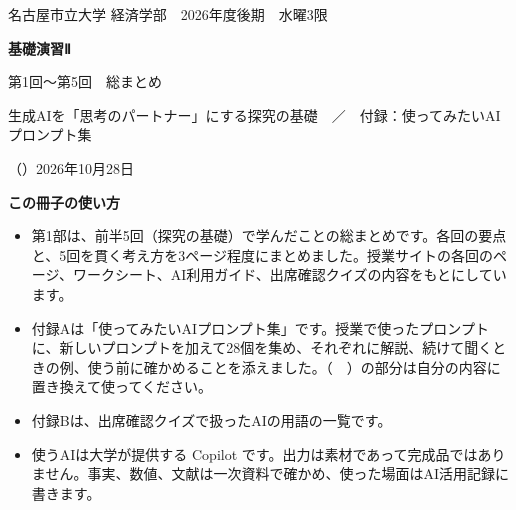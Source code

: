 
\renewcommand*\doctitle{第1回〜第5回 総まとめ}
\renewcommand*\docdate{2026年10月28日}



\thispagestyle{cover}
\vspace*{8mm}
{\sffamily\color{pone}\large 名古屋市立大学 経済学部　2026年度後期　水曜3限}\par
\vspace{3mm}
{\sffamily\bfseries\fontsize{30pt}{38pt}\selectfont 基礎演習Ⅱ}\par
\vspace{2mm}
{\sffamily\fontsize{20pt}{26pt}\selectfont 第1回〜第5回　総まとめ}\par
\vspace{2.5mm}
{\sffamily\color{inktwo}生成AIを「思考のパートナー」にする探究の基礎　／　付録：使ってみたいAIプロンプト集}\par
\vspace{4mm}
\noindent{\color{inktwo}\rule{\linewidth}{0.6pt}}\par
\vspace{3mm}
{\sffamily\small \docauthor（\docaffil）\hfill\docdate}\par
\vspace{5mm}

\begin{tcolorbox}[enhanced,colback=papertwo,colframe=papertwo,boxrule=0pt,arc=1.5mm,
    left=4mm,right=4mm,top=3mm,bottom=3mm,fontupper=\small]
{\sffamily\bfseries この冊子の使い方}\par\vspace{1mm}
\begin{itemize}[label=・,itemsep=0.6mm]
  \item 第1部は、前半5回（探究の基礎）で学んだことの総まとめです。各回の要点と、5回を貫く考え方を3ページ程度にまとめました。授業サイトの各回のページ、ワークシート、AI利用ガイド、出席確認クイズの内容をもとにしています。
  \item 付録Aは「使ってみたいAIプロンプト集」です。授業で使ったプロンプトに、新しいプロンプトを加えて28個を集め、それぞれに解説、続けて聞くときの例、使う前に確かめることを添えました。（　）の部分は自分の内容に置き換えて使ってください。
  \item 付録Bは、出席確認クイズで扱ったAIの用語の一覧です。
  \item 使うAIは大学が提供する Copilot です。出力は素材であって完成品ではありません。事実、数値、文献は一次資料で確かめ、使った場面はAI活用記録に書きます。
\end{itemize}
\end{tcolorbox}

